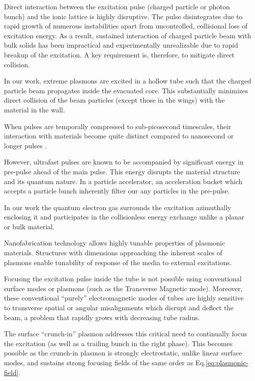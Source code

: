 \documentclass[aps,twocolumn,notitlepage,superscriptaddress]{revtex4-1}
\begin{document}
 Direct interaction between the excitation pulse (charged particle or photon bunch) and the ionic lattice is highly disruptive. The pulse disintegrates due to rapid growth of numerous instabilities apart from uncontrolled, collisional loss of excitation energy. As a result, sustained interaction of charged particle beam with bulk solids has been impractical and experimentally unrealizable due to rapid breakup of the excitation\cite{filamentation}. A key requirement is, therefore, to mitigate direct collision.  

In our work, extreme plasmons are excited in a hollow tube such that the charged particle beam propagates inside the evacuated core. This substantially minimizes direct collision of the beam particles (except those in the wings) with the material in the wall.

 When pulses are temporally compressed to sub-picosecond timescales, their interaction with materials become quite distinct compared to nanosecond or longer pulses \cite{lasik-surgery}. 

However, ultrafast pulses are known to be accompanied by significant energy in pre-pulse ahead of the main pulse. This energy disrupts the material structure and its quantum nature. In a particle accelerator, an acceleration bucket which accepts a particle bunch inherently filter our any particles in the pre-pulse.
 
 In our work the quantum electron gas surrounds the excitation azimuthally enclosing it and participates in the collisionless energy exchange unlike a planar or bulk material.

 Nanofabrication technology allows highly tunable properties of plasmonic materials. Structures with dimensions approaching the inherent scales of plasmons enable tunability of response of the media to external excitations.

 Focusing the excitation pulse inside the tube is not possible using conventional surface modes or plasmons (such as the Transverse Magnetic mode). Moreover, these conventional ``purely'' electromagnetic modes of tubes are highly sensitive to transverse spatial or angular misalignments which disrupt and deflect the beam, a problem that rapidly grows with decreasing tube radius.

The surface ``crunch-in'' plasmon \cite{ion-wake,crunch-in-regime} addresses this critical need to continually focus the excitation (as well as a trailing bunch in the right phase). This becomes possible as the crunch-in plasmon is strongly electrostatic, unlike linear surface modes, and sustains strong focusing fields of the same order as Eq.\ref{eq:plasmonic-field}.
\end{document}
